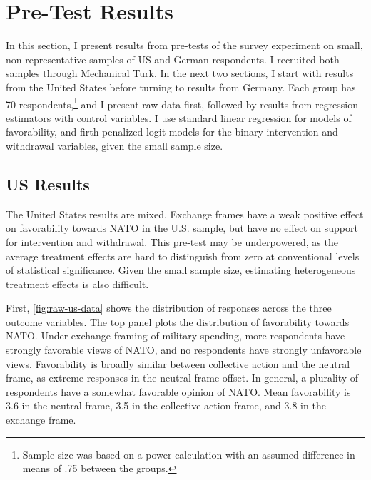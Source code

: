 \documentclass[12pt]{article}
\begin{document}
\section{Pre-Test Results} 

In this section, I present results from pre-tests of the survey experiment on small, non-representative samples of US and German respondents.
I recruited both samples through Mechanical Turk. 
In the next two sections, I start with results from the United States before turning to results from Germany. 
Each group has 70 respondents,\footnote{Sample size was based on a power calculation with an assumed difference in means of .75 between the groups.} and I present raw data first, followed by results from regression estimators with control variables. 
I use standard linear regression for models of favorability, and firth penalized logit models for the binary intervention and withdrawal variables, given the small sample size. 


\subsection{US Results} 

The United States results are mixed. 
Exchange frames have a weak positive effect on favorability towards NATO in the U.S. sample, but have no effect on support for intervention and withdrawal. 
This pre-test may be underpowered, as the average treatment effects are hard to distinguish from zero at conventional levels of statistical significance. 
Given the small sample size, estimating heterogeneous treatment effects is also difficult.


First, \autoref{fig:raw-us-data} shows the distribution of responses across the three outcome variables. 
The top panel plots the distribution of favorability towards NATO. 
Under exchange framing of military spending, more respondents have strongly favorable views of NATO, and no respondents have strongly unfavorable views. 
Favorability is broadly similar between collective action and the neutral frame, as extreme responses in the neutral frame offset. 
In general, a plurality of respondents have a somewhat favorable opinion of NATO.
Mean favorability is 3.6 in the neutral frame, 3.5 in the collective action frame, and 3.8 in the exchange frame.  
\end{document}
